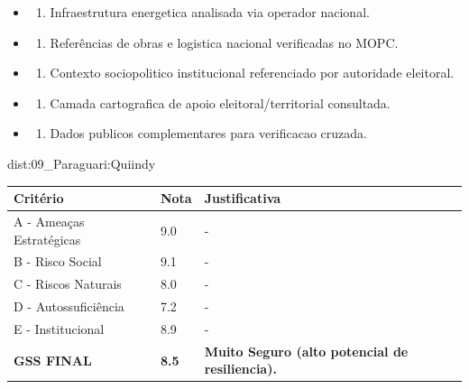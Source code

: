 {\begin{itemize}
\item
  \begin{enumerate}
  \def\labelenumi{\arabic{enumi})}
  \setcounter{enumi}{7}
  \tightlist
  \item
    Infraestrutura energetica analisada via operador nacional.
  \end{enumerate}
\item
  \begin{enumerate}
  \def\labelenumi{\arabic{enumi})}
  \setcounter{enumi}{8}
  \tightlist
  \item
    Referências de obras e logistica nacional verificadas no MOPC.
  \end{enumerate}
\item
  \begin{enumerate}
  \def\labelenumi{\arabic{enumi})}
  \setcounter{enumi}{9}
  \tightlist
  \item
    Contexto sociopolitico institucional referenciado por autoridade
    eleitoral.
  \end{enumerate}
\item
  \begin{enumerate}
  \def\labelenumi{\arabic{enumi})}
  \setcounter{enumi}{10}
  \tightlist
  \item
    Camada cartografica de apoio eleitoral/\allowbreak territorial consultada.
  \end{enumerate}
\item
  \begin{enumerate}
  \def\labelenumi{\arabic{enumi})}
  \setcounter{enumi}{11}
  \tightlist
  \item
    Dados publicos complementares para verificacao cruzada.
  \end{enumerate}
\end{itemize}}{dist:09_Paraguari:Quiindy}
\begin{table}[ht!]
\small \begin{tabular}{p{3.0cm}p{0.8cm}p{6.0cm}} \toprule
\textbf{Critério} & \textbf{Nota} & \textbf{Justificativa} \\ \midrule
A - Ameaças Estratégicas & 9.0 & - \\
B - Risco Social & 9.1 & - \\
C - Riscos Naturais & 8.0 & - \\
D - Autossuficiência & 7.2 & - \\
E - Institucional & 8.9 & - \\
\midrule \textbf{GSS FINAL} & \textbf{8.5} & \textbf{Muito Seguro (alto potencial de resiliencia).} \\ \bottomrule \end{tabular}
\end{table}
